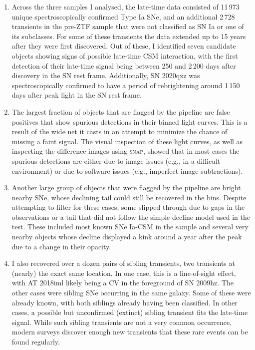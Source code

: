 \documentclass[a4paper,oneside,12pt, class=Latex/Classes/PhDthesisPSnPDF, crop=false]{standalone}
\begin{document}
\begin{enumerate}
	\item Across the three samples I analysed, the late-time data consisted of 11\,973 unique spectroscopically confirmed Type Ia SNe, and an additional 2\,728 transients in the pre-ZTF sample that were not classified as SN Ia or one of its subclasses. For some of these transients the data extended up to 15 years after they were first discovered. Out of these, I identified seven candidate objects showing signs of possible late-time CSM interaction, with the first detection of their late-time signal being between 250 and 2\,200 days after discovery in the SN rest frame. Additionally, SN 2020qxz was spectroscopically confirmed to have a period of rebrightening around 1\,150 days after peak light in the SN rest frame.
	\item The largest fraction of objects that are flagged by the pipeline are false positives that show spurious detections in their binned light curves. This is a result of the wide net it casts in an attempt to minimize the chance of missing a faint signal. The visual inspection of these light curves, as well as inspecting the difference images using \textsc{snap}, showed that in most cases the spurious detections are either due to image issues (e.g., in a difficult environment) or due to software issues (e.g., imperfect image subtractions).
	\item Another large group of objects that were flagged by the pipeline are bright nearby SNe, whose declining tail could still be recovered in the bins. Despite attempting to filter for these cases, some slipped through due to gaps in the observations or a tail that did not follow the simple decline model used in the test. These included most known SNe Ia-CSM in the sample and several very nearby objects whose decline displayed a kink around a year after the peak due to a change in their opacity.
	\item I also recovered over a dozen pairs of sibling transients, two transients at (nearly) the exact same location. In one case, this is a line-of-sight effect, with AT 2018iml likely being a CV in the foreground of SN 2009hz. The other cases were sibling SNe occurring in the same galaxy. Some of these were already known, with both siblings already having been classified. In other cases, a possible but unconfirmed (extinct) sibling transient fits the late-time signal. While such sibling transients are not a very common occurrence, modern surveys discover enough new transients that these rare events can be found regularly.

\end{enumerate}
\end{document}
